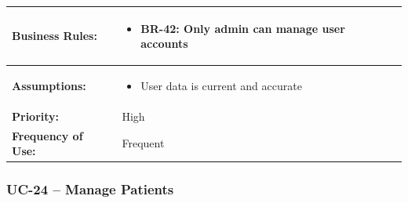 \documentclass[12pt,a4paper]{article}
\begin{document}
\begin{longtable}{|p{4.5cm}|p{10.5cm}|}
\textbf{Business Rules:} &
\begin{itemize}
  \item BR-42: Only admin can manage user accounts
\end{itemize} \\
\hline
\textbf{Assumptions:} &
\begin{itemize}
  \item User data is current and accurate
\end{itemize} \\
\hline
\textbf{Priority:} & High \\
\hline
\textbf{Frequency of Use:} & Frequent \\
\hline
\end{longtable}

\subsubsection{UC-24 – Manage Patients}
\end{document}
